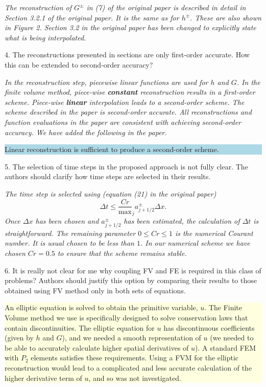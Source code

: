 \documentclass[subeqn]{article}
\newcommand{\hlb}[1] {\par\colorbox{lightblue}{\parbox{\linewidth}{#1}}}
\newcommand{\hly}[1] {\par\colorbox{lightyellow}{\parbox{\linewidth}{#1}}}
\begin{document}
\emph{The reconstruction of $G^\pm$ in (7) of the original paper is described in detail in Section 3.2.1 of the original paper. It is the same as for $h^\pm$. These are also shown in Figure 2. Section 3.2 in the original paper has been changed to explicitly state what is being interpolated.}

4. The reconstructions presented in sections are only first-order accurate. How this can be extended to second-order accuracy?

\emph{In the reconstruction step, piecewise linear functions are used for $h$ and $G$. In the finite volume method, piece-wise \textbf{constant} reconstruction results in a first-order scheme. Piece-wise \textbf{linear} interpolation leads to a second-order scheme. The scheme described in the paper is second-order accurate. All reconstructions and function evaluations in the paper are consistent with achieving second-order accuracy. We have added the following in the paper.}
\hlb{Linear reconstruction is sufficient to produce a second-order scheme.}

5. The selection of time steps in the proposed approach is not fully clear. The authors should clarify how time steps are selected in their results.

\emph{The time step is selected using (equation (21) in the original paper)
\[
\Delta t \le \dfrac{Cr}{\max}_j {a^\pm_{j+1/2}} \Delta x.
\]
Once $\Delta x$ has been chosen and $a^\pm_{j+1/2}$ has been estimated, the calculation of $\Delta t$ is straightforward. The remaining parameter $0 \le Cr \le 1$ is the numerical Courant number. It is usual chosen  to be less than $1$. In our numerical scheme we have chosen $Cr = 0.5$ to ensure that the scheme remains stable.}

6. It is really not clear for me why coupling FV and FE is required in this class of problems? Authors should justify this option by comparing their results to those obtained using FV method only in both sets of equations.

\hly{An elliptic equation is solved to obtain the primitive variable, $u$. The Finite Volume method we use is specifically designed to solve conservation laws that contain discontinuities.  
The elliptic equation for $u$ has discontinuous coefficients (given by $h$ and $G$), and we needed a smooth representation of $u$ (we needed to be able to accurately calculate higher spatial derivatives of $u$). A standard FEM with $P_2$ elements satisfies these requirements. 
Using a FVM for the elliptic reconstruction would lead to a complicated and less accurate calculation of the higher derivative term of $u$, and so was not investigated. }
\end{document}
